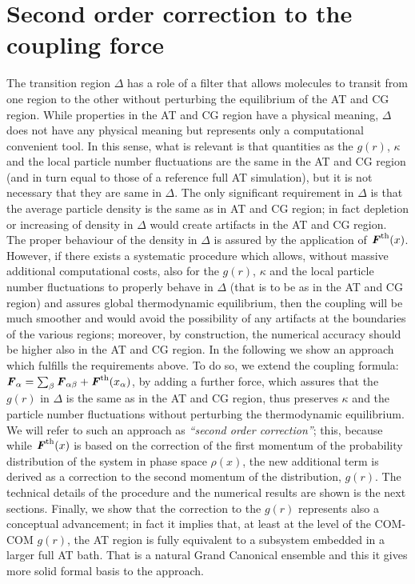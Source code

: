 \documentclass[aps,pre,preprint]{revtex4}
\renewcommand{\v}[1]{\textbf{\textit{#1}}}
\begin{document}
\section{Second order correction to the coupling force}
The transition region $\Delta$ has a role of a filter that allows molecules to transit from one region to the other without perturbing the equilibrium of the AT and CG region. While properties in the AT and CG region have a physical meaning, $\Delta$ does not have any physical meaning but represents only a computational convenient tool. In this sense, what is relevant is that quantities  as the $g(r)$, $\kappa$ and the local particle number fluctuations are the same in the AT and CG region (and in turn equal to those of a reference full AT simulation), but it is not necessary that they are same in $\Delta$.
The only significant requirement in $\Delta$ is that the average particle density is the same as in AT and CG region; in fact depletion or increasing of density in $\Delta$ would create artifacts in the AT and CG region. The proper behaviour of the density in $\Delta$ is assured by the application of 
${\v F}^{\textrm{th}}(x)$. However, if there exists a systematic procedure which allows, without massive additional computational costs, also for the $g(r)$, $\kappa$ and the local particle number fluctuations to properly behave in $\Delta$ (that is to be as in the AT and CG region) and assures global thermodynamic equilibrium, then the coupling will be much smoother and would avoid the possibility of any artifacts at the boundaries of the various regions; moreover, by construction, the numerical accuracy should be higher also in the AT and CG region. In the following we show an approach which fulfills the requirements above. To do so, we extend the coupling formula: ${\v F}_{\alpha}=\sum_{\beta}{\v F}_{\alpha\beta}+{\v F}^{\textrm{th}}(x_{\alpha})$, by adding a further force, which assures that the $g(r)$ in $\Delta$ is the same as in the AT and CG region, thus preserves $\kappa$ and the particle number fluctuations without perturbing the thermodynamic equilibrium. We will refer to such an approach as {\it ``second order correction''}; this, because while ${\v F}^{\textrm{th}}(x)$ is based on the correction of the first momentum of the probability distribution of the system in phase space $\rho(x)$, the new additional term is derived as a correction to the second momentum of the distribution, $g(r)$. The technical details of the procedure and the numerical results are shown is the next sections. Finally, we show that the correction to the $g(r)$ represents also a conceptual advancement; in fact it implies that, at least at the level of the COM-COM $g(r)$, the AT region is fully equivalent to a subsystem embedded in a larger full AT bath. That is a natural Grand Canonical ensemble and this it gives more solid formal basis to the approach. 
\end{document}
